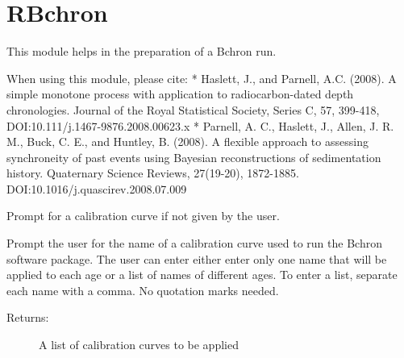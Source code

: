 \documentclass[letterpaper,10pt,english]{sphinxmanual}
\begin{document}
\chapter{RBchron}
\label{\detokenize{RBchron:rbchron}}\label{\detokenize{RBchron::doc}}
This module helps in the preparation of a Bchron run.

When using this module, please cite:
* Haslett, J., and Parnell, A.C. (2008). A simple monotone process with application to radiocarbon-dated depth chronologies. Journal of the Royal Statistical Society, Series C, 57, 399-418, DOI:10.111/j.1467-9876.2008.00623.x
* Parnell, A. C., Haslett, J., Allen, J. R. M., Buck, C. E.,  and Huntley, B. (2008). A flexible approach to assessing  synchroneity of past events using Bayesian reconstructions of sedimentation history. Quaternary Science Reviews, 27(19-20), 1872-1885. DOI:10.1016/j.quascirev.2008.07.009

\begin{fulllineitems}
\label{\detokenize{RBchron:pyleoclim.RBchron.chooseCalCurves}}
Prompt for a calibration curve if not given by the user.

Prompt the user for the name of a calibration curve used to run the Bchron 
software package. The user can enter either enter only one name that will
be applied to each age or a list of names of different ages. To enter a list, 
separate each name with a comma. No quotation marks needed.
\begin{description}
\item[{Returns:}] \leavevmode
A list of calibration curves to be applied

\end{description}

\end{fulllineitems}

\end{document}
